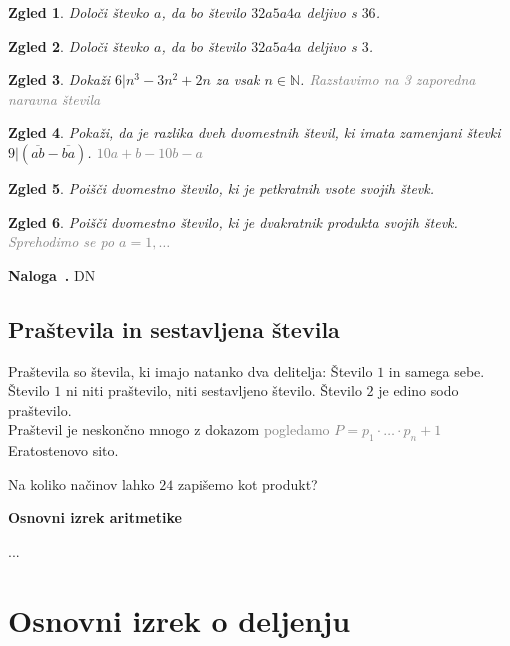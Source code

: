 \documentclass{article}
\newcounter{example}[section]
\newenvironment{example}[1][]{\refstepcounter{example}\par\medskip
   \noindent \textbf{Naloga~\theexample. #1} \rmfamily}{\medskip}
\newtheorem*{zgled}{Zgled}
\begin{document}
\begin{zgled}
    Določi števko $a$, da bo število $32a5a4a$ deljivo s $36$.
\end{zgled}

\begin{zgled}
    Določi števko $a$, da bo število $32a5a4a$ deljivo s $3$.
\end{zgled}

\begin{zgled}
    Dokaži $6|n^3-3n^2+2n$ za vsak $n\in\mathbb{N}$. \textcolor{gray}{Razstavimo na 3 zaporedna naravna števila}
\end{zgled}

\begin{zgled}
    Pokaži, da je razlika dveh dvomestnih števil, ki imata zamenjani števki $9|\left(\overline{ab}-\overline{ba}\right)$. \textcolor{gray}{$10a+b-10b-a$}
\end{zgled}

\begin{zgled}
    Poišči dvomestno število, ki je petkratnih vsote svojih števk.
\end{zgled}

\begin{zgled}
    Poišči dvomestno število, ki je dvakratnik produkta svojih števk. \textcolor{gray}{Sprehodimo se po $a=1,\ldots$}
\end{zgled}

\begin{example}
    DN 
\end{example}

\subsection{Praštevila in sestavljena števila}

Praštevila so števila, ki imajo natanko dva delitelja: Število $1$ in samega sebe.\\
Število $1$ ni niti praštevilo, niti sestavljeno število. Število $2$ je edino sodo praštevilo.\\
Praštevil je neskončno mnogo z dokazom \textcolor{gray}{pogledamo $P=p_1 \cdot \ldots \cdot p_n +1$}\\
Eratostenovo sito.

Na koliko načinov lahko $24$ zapišemo kot produkt?

\textbf{Osnovni izrek aritmetike}

...

\section{Osnovni izrek o deljenju}
\end{document}
